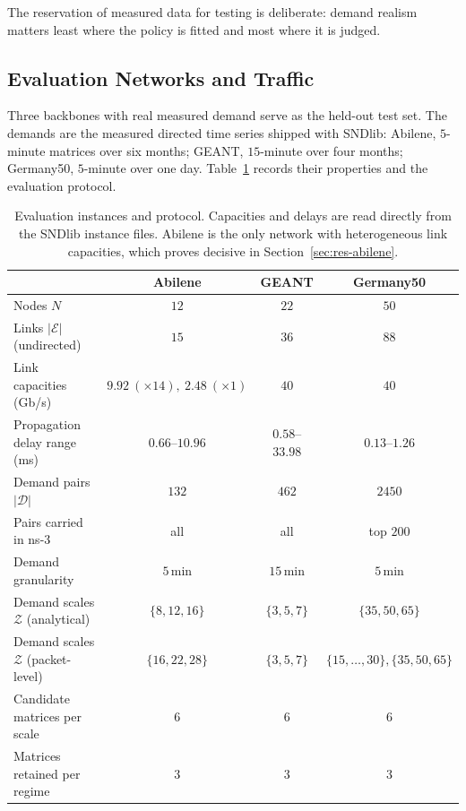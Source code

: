 The reservation of measured data for testing is deliberate: demand realism
matters least where the policy is fitted and most where it is judged.

\subsection{Evaluation Networks and Traffic}
\label{sec:setup-instances}

Three backbones with real measured demand serve as the held-out test set. The
demands are the measured directed time series shipped with SNDlib: Abilene,
$5$-minute matrices over six months; GEANT, $15$-minute over four months;
Germany50, $5$-minute over one day. Table~\ref{tab:eval-setup} records their
properties and the evaluation protocol.

\begin{table}[h]
\centering
\small
\begin{tabular}{lccc}
\hline
& Abilene & GEANT & Germany50 \\
\hline
Nodes $N$ & $12$ & $22$ & $50$ \\
Links $|\mathcal{E}|$ (undirected) & $15$ & $36$ & $88$ \\
Link capacities (Gb/s) & $9.92\ (\times 14),\ 2.48\ (\times 1)$ & $40$ & $40$ \\
Propagation delay range (ms) & $0.66$--$10.96$ & $0.58$--$33.98$ & $0.13$--$1.26$ \\
Demand pairs $|\mathcal{D}|$ & $132$ & $462$ & $2450$ \\
Pairs carried in ns-3 & all & all & top $200$ \\
Demand granularity & $5$\,min & $15$\,min & $5$\,min \\
\hline
Demand scales $\mathcal{Z}$ (analytical) & $\{8,12,16\}$ & $\{3,5,7\}$ & $\{35,50,65\}$ \\
Demand scales $\mathcal{Z}$ (packet-level) & $\{16,22,28\}$ & $\{3,5,7\}$ & $\{15,\dots,30\},\{35,50,65\}$ \\
Candidate matrices per scale & $6$ & $6$ & $6$ \\
Matrices retained per regime & $3$ & $3$ & $3$ \\
\hline
\end{tabular}
\caption{Evaluation instances and protocol. Capacities and delays are read
directly from the SNDlib instance files. Abilene is the only network with
heterogeneous link capacities, which proves decisive in
Section~\ref{sec:res-abilene}.}
\label{tab:eval-setup}
\end{table}

